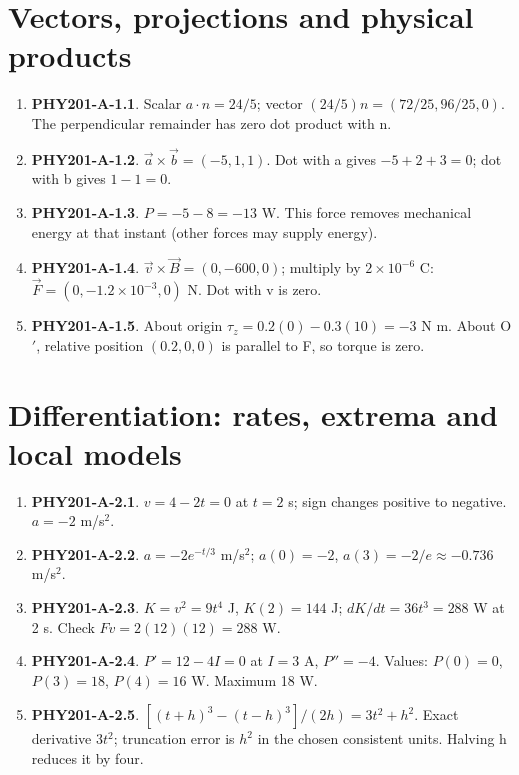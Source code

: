 \documentclass[11pt,a4paper,openany]{book}
\begin{document}
\section{Vectors, projections and physical products}
\begin{enumerate}
\item \textbf{PHY201-A-1.1}. Scalar $a\cdot n=24/5$; vector $(24/5)n=(72/25,96/25,0)$. The perpendicular remainder has zero dot product with n.
\item \textbf{PHY201-A-1.2}. $\vec a\times\vec b=(-5,1,1)$. Dot with a gives $-5+2+3=0$; dot with b gives $1-1=0$.
\item \textbf{PHY201-A-1.3}. $P=-5-8=-13$ W. This force removes mechanical energy at that instant (other forces may supply energy).
\item \textbf{PHY201-A-1.4}. $\vec v\times\vec B=(0,-600,0)$; multiply by $2\times10^{-6}$ C: $\vec F=(0,-1.2\times10^{-3},0)$ N. Dot with v is zero.
\item \textbf{PHY201-A-1.5}. About origin $\tau_z=0.2(0)-0.3(10)=-3$ N m. About O\ensuremath{\prime}, relative position $(0.2,0,0)$ is parallel to F, so torque is zero.
\end{enumerate}
\section{Differentiation: rates, extrema and local models}
\begin{enumerate}
\item \textbf{PHY201-A-2.1}. $v=4-2t=0$ at $t=2$ s; sign changes positive to negative. $a=-2$ m/s$^2$.
\item \textbf{PHY201-A-2.2}. $a=-2e^{-t/3}$ m/s$^2$; $a(0)=-2$, $a(3)=-2/e\approx-0.736$ m/s$^2$.
\item \textbf{PHY201-A-2.3}. $K=v^2=9t^4$ J, $K(2)=144$ J; $dK/dt=36t^3=288$ W at 2 s. Check $Fv=2(12)(12)=288$ W.
\item \textbf{PHY201-A-2.4}. $P'=12-4I=0$ at $I=3$ A, $P''=-4$. Values: $P(0)=0$, $P(3)=18$, $P(4)=16$ W. Maximum 18 W.
\item \textbf{PHY201-A-2.5}. $[(t+h)^3-(t-h)^3]/(2h)=3t^2+h^2$. Exact derivative $3t^2$; truncation error is $h^2$ in the chosen consistent units. Halving h reduces it by four.
\end{enumerate}
\end{document}
